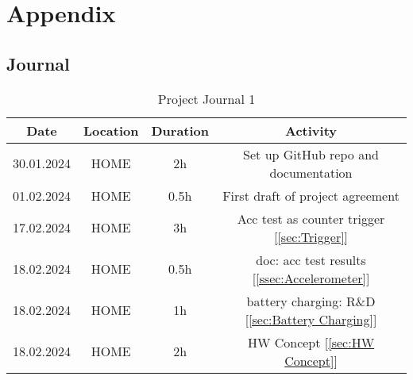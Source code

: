 \chapter{Appendix}
\label{cha:Appendix}

\section{Journal}
\label{sec:Journal}

\begin{table}[H]
    \centering
    
\begin{tabular}{||c | c | c || c||} 
 \hline
 Date &  Location & Duration & Activity \\ [0.5ex] 
 \hline\hline
  30.01.2024 & HOME & 2h & Set up GitHub repo and documentation \\ 
 \hline
   01.02.2024 & HOME & 0.5h & First draft of project agreement \\ 
 \hline
    17.02.2024 & HOME & 3h & Acc test as counter trigger [\ref{sec:Trigger}] \\ 
 \hline
    18.02.2024 & HOME & 0.5h & doc: acc test results [\ref{ssec:Accelerometer}] \\ 
 \hline
     18.02.2024 & HOME & 1h & battery charging: R\&D [\ref{sec:Battery Charging}] \\ 
 \hline
      18.02.2024 & HOME & 2h & HW Concept [\ref{sec:HW Concept}] \\ 
 \hline


\end{tabular}
    \caption{Project Journal 1}
    \label{tab:Project Journal 1}
\end{table}

\newpage